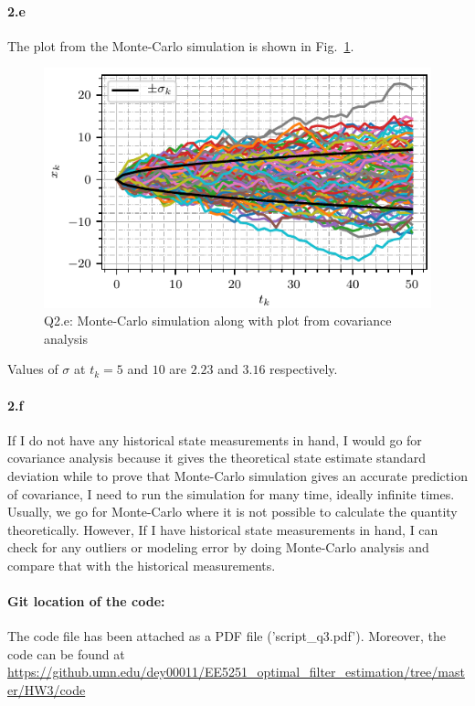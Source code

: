 \paragraph{2.e}The plot from the Monte-Carlo simulation is shown in Fig.~\ref{fig:q2_e}.
\begin{figure}[h]
	\centering
	\includegraphics[scale=1.0,trim={0cm 0cm 0cm 0cm},clip]{./code/generatedPlots/q2_e.pdf}
	\caption{Q2.e: Monte-Carlo simulation along with plot from covariance analysis}
	\label{fig:q2_e}
\end{figure}
Values of $\sigma$ at $t_k=5$ and $10$ are $2.23$ and $3.16$ respectively.
\paragraph{2.f}If I do not have any historical state measurements in hand, I would go for covariance analysis because it gives the theoretical state estimate standard deviation while to prove that Monte-Carlo simulation gives an accurate prediction of covariance, I need to run the simulation for many time, ideally infinite times. Usually, we go for Monte-Carlo where it is not possible to calculate the quantity theoretically. However, If I have historical state measurements in hand, I can check for any outliers or modeling error by doing Monte-Carlo analysis and compare that with the historical measurements.
\paragraph{Git location of the code:} The code file has been attached as a PDF file ('script\_q3.pdf'). Moreover, the code can be found at\\
\url{https://github.umn.edu/dey00011/EE5251\_optimal\_filter\_estimation/tree/master/HW3/code}